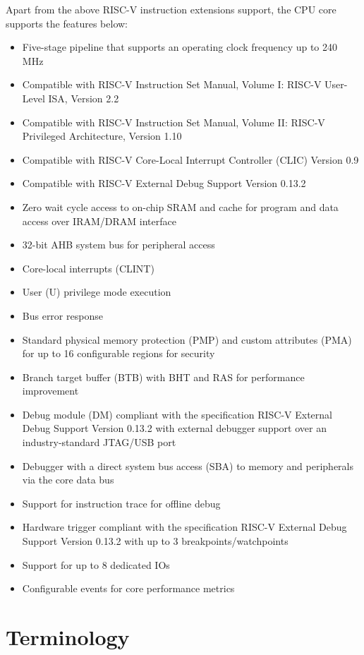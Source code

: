 \documentclass[main\_\_EN.tex]{subfiles}
\begin{document}
Apart from the above RISC-V instruction extensions support, the CPU core supports the features below:
\begin{itemize}
    \item  Five-stage pipeline that supports an operating clock frequency up to 240 MHz
    \item Compatible with RISC-V Instruction Set Manual, Volume I: RISC-V User-Level ISA, Version 2.2
    \item Compatible with RISC-V Instruction Set Manual, Volume II: RISC-V Privileged Architecture, Version 1.10
    \item Compatible with RISC-V Core-Local Interrupt Controller (CLIC) Version 0.9
    \item Compatible with RISC-V External Debug Support Version 0.13.2
    \item Zero wait cycle access to on-chip SRAM and cache for program and data access over IRAM/DRAM interface
    \item 32-bit AHB system bus for peripheral access
    \item Core-local interrupts (CLINT)
    \item User (U) privilege mode execution
    \item Bus error response
    \item Standard physical memory protection (PMP) and custom attributes (PMA) for up to 16 configurable regions for security
    \item Branch target buffer (BTB) with BHT and RAS for performance improvement
    \item Debug module (DM) compliant with the specification RISC-V External Debug Support Version 0.13.2 with external debugger support over an industry-standard JTAG/USB port
    \item Debugger with a direct system bus access (SBA) to memory and peripherals via the core data bus
    \item Support for instruction trace for offline debug
    \item Hardware trigger compliant with the specification RISC-V External Debug Support Version 0.13.2 with up to 3 breakpoints/watchpoints
    \item Support for up to 8 dedicated IOs
    \item Configurable events for core performance metrics
\end{itemize}

\section{Terminology}
\end{document}
